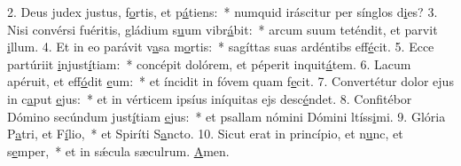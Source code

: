 2. Deus judex justus, f\uline{o}rtis, et p\uline{á}tiens:~* numquid iráscitur per sínglos d\uline{i}es?
3. Nisi convérsi fuéritis, gládium s\uline{u}um vibr\uline{á}bit:~* arcum suum teténdit, et parvit \uline{i}llum.
4. Et in eo parávit v\uline{a}sa m\uline{o}rtis:~* sagíttas suas ardéntibs eff\uline{é}cit.
5. Ecce partúriit \uline{i}njust\uline{í}tiam:~* concépit dolórem, et péperit inquit\uline{á}tem.
6. Lacum apéruit, et eff\uline{ó}dit \uline{e}um:~* et íncidit in fóvem quam f\uline{e}cit.
7. Convertétur dolor ejus in c\uline{a}put \uline{e}jus:~* et in vérticem ipsíus iníquitas ejs desc\uline{é}ndet.
8. Confitébor Dómino secúndum just\uline{í}tiam \uline{e}jus:~* et psallam nómini Dómini ltíss\uline{i}mi.
9. Glória P\uline{a}tri, et F\uline{í}lio,~* et Spiríti S\uline{a}ncto.
10. Sicut erat in princípio, et n\uline{u}nc, et s\uline{e}mper,~* et in sǽcula sæculrum. \uline{A}men.
